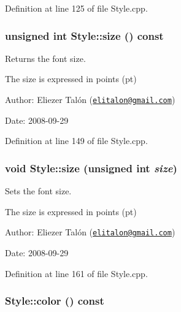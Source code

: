 Definition at line 125 of file Style.cpp.\hypertarget{class_style_73cb356fdfc022f51ff263b1c1faa9fd}{
\subsubsection[size]{\setlength{\rightskip}{0pt plus 5cm}unsigned int Style::size () const}}
\label{class_style_73cb356fdfc022f51ff263b1c1faa9fd}


Returns the font size. 

The size is expressed in points (pt)

\begin{Desc}
\item[Author:]Eliezer Talón (\href{mailto:elitalon@gmail.com}{\tt elitalon@gmail.com}) \end{Desc}
\begin{Desc}
\item[Date:]2008-09-29 \end{Desc}


Definition at line 149 of file Style.cpp.\hypertarget{class_style_9ef3273bd0c0558d7203a87ac26cf4d2}{
\subsubsection[size]{\setlength{\rightskip}{0pt plus 5cm}void Style::size (unsigned int {\em size})}}
\label{class_style_9ef3273bd0c0558d7203a87ac26cf4d2}


Sets the font size. 

The size is expressed in points (pt)

\begin{Desc}
\item[Author:]Eliezer Talón (\href{mailto:elitalon@gmail.com}{\tt elitalon@gmail.com}) \end{Desc}
\begin{Desc}
\item[Date:]2008-09-29 \end{Desc}


Definition at line 161 of file Style.cpp.\hypertarget{class_style_71b938a521e8c6e30926ddb3d0aa83b3}{
\subsubsection[color]{ Style::color () const}}
\label{class_style_71b938a521e8c6e30926ddb3d0aa83b3}


